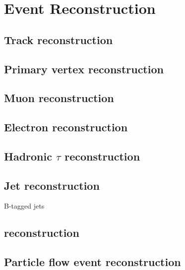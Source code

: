 \chapter{Event Reconstruction}
\label{chap:EventReconstruction}


\section{Track reconstruction}

\section{Primary vertex reconstruction}

\section{Muon reconstruction}
\label{sec:MuonReconstruction}

\section{Electron reconstruction}
\label{sec:ElectronReconstruction}

\section{Hadronic \texorpdfstring{$\tau$}{tau} reconstruction}

\section{Jet reconstruction}
\label{sec:TaggedBJets}

B-tagged jets~\cite{Chatrchyan:2012jua}

\section{\texorpdfstring{\MET}{Missing transverse energy} reconstruction}
\label{sec:METReconstruction}

\section{Particle flow event reconstruction}